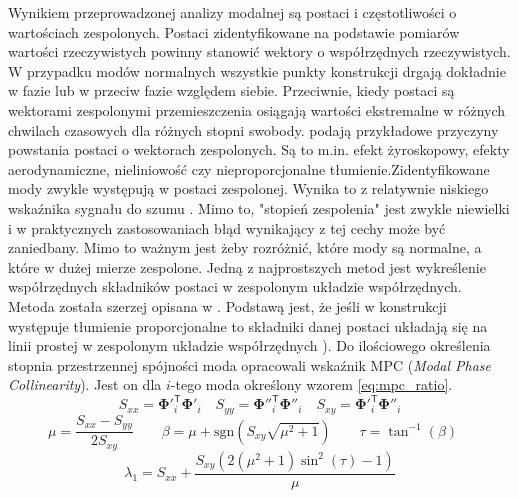 Wynikiem przeprowadzonej analizy modalnej są postaci i częstotliwości o wartościach zespolonych. Postaci zidentyfikowane na podstawie pomiarów wartości rzeczywistych powinny stanowić wektory o współrzędnych rzeczywistych. W przypadku modów normalnych wszystkie punkty konstrukcji drgają dokładnie w fazie lub w przeciw fazie względem siebie. Przeciwnie, kiedy postaci są wektorami zespolonymi przemieszczenia osiągają wartości ekstremalne w różnych chwilach czasowych dla różnych stopni swobody. \cite{ewins_modal_2000,chopra_dynamics_2012} podają przykładowe przyczyny powstania postaci o wektorach zespolonych. Są to m.in. efekt żyroskopowy, efekty aerodynamiczne, nieliniowość czy nieproporcjonalne tłumienie.Zidentyfikowane mody zwykle występują w postaci zespolonej. Wynika to z relatywnie niskiego wskaźnika sygnału do szumu \parencite{rainieri_operational_2014}. Mimo to, "stopień zespolenia" jest zwykle niewielki i w praktycznych zastosowaniach błąd wynikający z tej cechy może być zaniedbany. Mimo to ważnym jest żeby rozróżnić, które mody są normalne, a które w dużej mierze zespolone. Jedną z najprostszych metod jest wykreślenie współrzędnych składników postaci w zespolonym układzie współrzędnych. Metoda została szerzej opisana w \parencite{ewins_modal_2000}. Podstawą jest, że jeśli w konstrukcji występuje tłumienie proporcjonalne to składniki danej postaci układają się na linii prostej w zespolonym układzie współrzędnych \parencite{rainieri_operational_2014}).
Do ilościowego określenia stopnia przestrzennej spójności moda \cite{pappa_consistent-mode_1992} opracowali wskaźnik MPC (\textit{Modal Phase Collinearity}). Jest on dla $i$-tego moda określony wzorem \ref{eq:mpc_ratio}.
\begin{equation}
{S}_{xx}={\mathbf{\Phi}'}_{i}^{\mathsf{T}} {\mathbf{\Phi}} '_{i} \quad
{S}_{yy}={\mathbf{\Phi}''}_{i}^{\mathsf{T}} {\mathbf{\Phi}}''_{i} \quad
{S}_{xy}={\mathbf{\Phi}'}_{i}^{\mathsf{T}} {\mathbf{\Phi}}''_{i}
\end{equation}
\begin{equation}
{\mu}=\frac{S_{xx}-S_{yy}}{2S_{xy}} \quad \quad
\beta=\mu+\mathrm{sgn}(S_{xy}\sqrt{\mu^{2}+1}) \quad \quad
\tau=\tan^{-1}{(\beta)} \quad
\end{equation}
\begin{equation}
\lambda_{1}=S_{xx}+\frac{S_{xy}(2(\mu^{2}+1)\sin^{2}{(\tau)}-1)}{\mu}
\end{equation}
